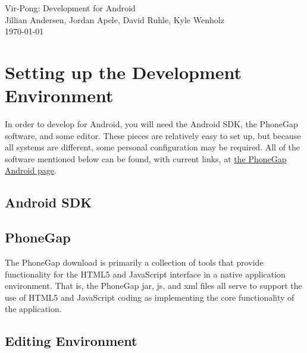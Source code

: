 \documentclass[12pt]{article}
\begin{document}
 \begin{titlepage}
    \vspace*{\fill}
    \begin{center}
      {\Huge Vir-Pong: Development for Android}\\[0.5cm]
      {\Large Jillian Andersen, Jordan Apele, David Ruhle, Kyle Wenholz}\\[0.4cm]
      \today
    \end{center}
    \vspace*{\fill}
  \end{titlepage}

\tableofcontents
\newpage

\section{Setting up the Development Environment}
In order to develop for Android, you will need the Android SDK, the PhoneGap software, and some editor.  These pieces are relatively easy to set up, but because all systems are different, some personal configuration may be required.  All of the software mentioned below can be found, with current links, at \href{http://www.phonegap.com/start#android}{the PhoneGap Android page}.  

\subsection{Android SDK}


\subsection{PhoneGap}
The PhoneGap download is primarily a collection of tools that provide functionality for the HTML5 and JavaScript interface in a native application environment.  That is, the PhoneGap jar, js, and xml files all serve to support the use of HTML5 and JavaScript coding as implementing the core functionality of the application.   

\subsection{Editing Environment}
\end{document}
